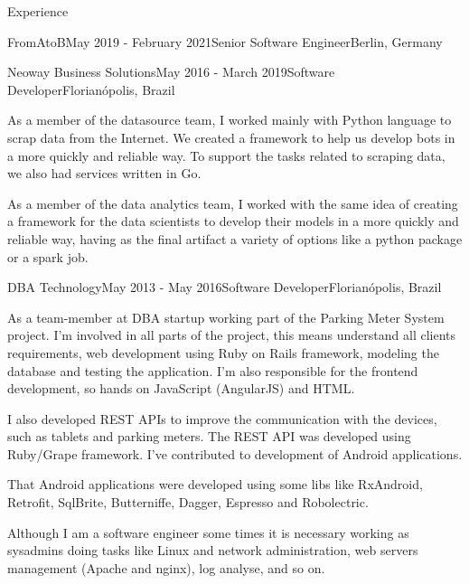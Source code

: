 \documentclass[
	a4paper, %
	11pt, %
]{resume} %
\begin{document}
\begin{rSection}{Experience}
\begin{rSubsection}{FromAtoB}{May 2019 - February 2021}{Senior Software Engineer}{Berlin, Germany}
	\end{rSubsection}


	\begin{rSubsection}{Neoway Business Solutions}{May 2016 - March 2019}{Software Developer}{Florianópolis, Brazil}
		\item As a member of the datasource team, I worked mainly with Python language to scrap data from the Internet. We created a framework to help us develop bots in a more quickly and reliable way.
To support the tasks related to scraping data, we also had services written in Go.


As a member of the data analytics team, I worked with the same idea of creating a framework for the data scientists to develop their models in a more quickly and reliable way, having as the final artifact a variety of options like a python package or a spark job.


	\end{rSubsection}


	\begin{rSubsection}{DBA Technology}{May 2013 - May 2016}{Software Developer}{Florianópolis, Brazil}
		\item As a team-member at DBA startup working part of the Parking Meter System project. I'm involved in all parts of the project, this means understand all clients requirements, web development using Ruby on Rails framework, modeling the database and testing the application. I'm also responsible for the frontend development, so hands on JavaScript (AngularJS) and HTML.

I also developed REST APIs to improve the communication with the devices, such as tablets and parking meters. The REST API was developed using Ruby/Grape framework. I've contributed to development of Android applications.

That Android applications were developed using some libs like RxAndroid, Retrofit, SqlBrite, Butterniffe, Dagger, Espresso and Robolectric.

Although I am a software engineer some times it is necessary working as sysadmins doing tasks like Linux and network administration, web servers management (Apache and nginx), log analyse, and so on.


	\end{rSubsection}

\end{rSection}
\end{document}
